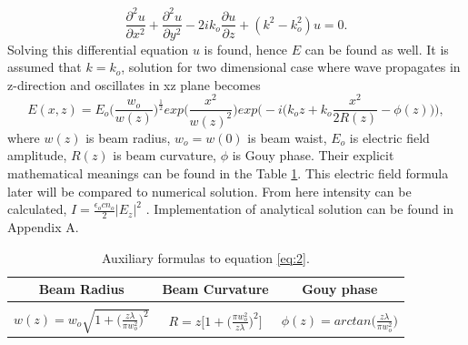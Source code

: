 \documentclass[a4paper]{article}
\begin{document}
	\begin{equation}\label{eq:1}
	\frac{\partial^2 u}{\partial x^2}+ \frac{\partial^2 u}{\partial y^2} - 2ik_o\frac{\partial u}{\partial z}+(k^2-k_o^2)u=0.
	\end{equation}
	Solving this differential equation $u$ is found, hence $E$ can be found as well. It is assumed that $k = k_o$, solution for two dimensional case where wave propagates in z-direction and oscillates in xz plane becomes
	\begin{equation}\label{eq:2}
	E(x,z)=E_o\bigg(\frac{w_o}{w(z)}\bigg)^{\frac{1}{2}}exp\bigg(\frac{x^2}{w(z)^2}\bigg)exp\bigg(-i\Big(k_oz+k_o\frac{x^2}{2R(z)}-\phi(z)\Big)\bigg),
	\end{equation}
	where $w(z)$ is beam radius, $w_o = w(0)$ is beam waist, $E_o$ is electric field amplitude, $R(z)$ is beam curvature, $\phi$ is Gouy phase. Their explicit mathematical meanings can be found in the Table \ref{tab:Table1}. This electric field formula later will be compared to numerical solution. From here intensity can be calculated, $I = \frac{\epsilon _o c n_o}{2}|E_z|^2$ \cite{link1}. Implementation of analytical solution can be found in Appendix A. 
	

	\begin{table}[h!]
		\begin{center}
			\begin{tabular}{c| c| c} %
				\textbf{Beam Radius} & \textbf{Beam Curvature} & \textbf{Gouy phase}\\
				\hline
				&&\\
				$w(z)= w_o\sqrt{1+\Big(\frac{z\lambda}{\pi w_o^2}\Big)^2}$ & $R=z\bigg[1+\Big(\frac{\pi w_o^2}{z\lambda}\Big)^2\bigg]$ & $\phi(z)=arctan\Big(\frac{z\lambda}{\pi w_o^2}\Big)$\\
			\end{tabular}
			\caption{\label{tab:Table1} Auxiliary formulas to equation \ref{eq:2}.}
		\end{center}
	\end{table}
	
\end{document}

